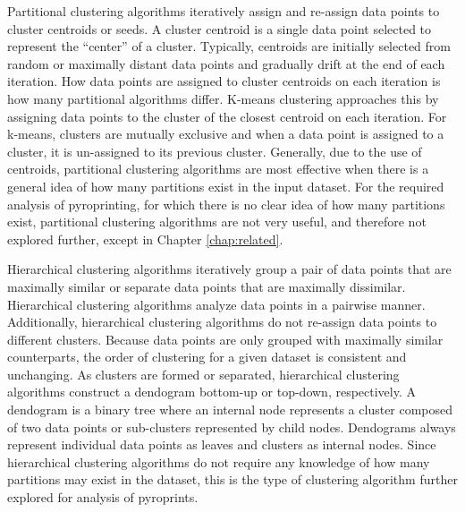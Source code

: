 \documentclass[12pt]{ucthesis}
\begin{document}
      Partitional clustering algorithms iteratively assign and re-assign data
      points to cluster centroids or seeds. A cluster centroid is a single data
      point selected to represent the ``center'' of a cluster. Typically,
      centroids are initially selected from random or maximally distant data
      points and gradually drift at the end of each iteration. How data points
      are assigned to cluster centroids on each iteration is how many
      partitional algorithms differ. K-means clustering approaches this by
      assigning data points to the cluster of the closest centroid on each
      iteration. For k-means, clusters are mutually exclusive and when a data
      point is assigned to a cluster, it is un-assigned to its previous
      cluster. Generally, due to the use of centroids, partitional clustering
      algorithms are most effective when there is a general idea of how many
      partitions exist in the input dataset. For the required analysis of
      pyroprinting, for which there is no clear idea of how many partitions
      exist, partitional clustering algorithms are not very useful, and
      therefore not explored further, except in Chapter \ref{chap:related}.
      
      Hierarchical clustering algorithms iteratively group a pair of data
      points that are maximally similar or separate data points that are
      maximally dissimilar. Hierarchical clustering algorithms analyze data
      points in a pairwise manner. Additionally, hierarchical clustering
      algorithms do not re-assign data points to different clusters. Because
      data points are only grouped with maximally similar counterparts, the
      order of clustering for a given dataset is consistent and unchanging. As
      clusters are formed or separated, hierarchical clustering algorithms
      construct a dendogram bottom-up or top-down, respectively. A dendogram is
      a binary tree where an internal node represents a cluster composed of two
      data points or sub-clusters represented by child nodes. Dendograms always
      represent individual data points as leaves and clusters as internal
      nodes. Since hierarchical clustering algorithms do not require any
      knowledge of how many partitions may exist in the dataset, this is the
      type of clustering algorithm further explored for analysis of
      pyroprints.
\end{document}
